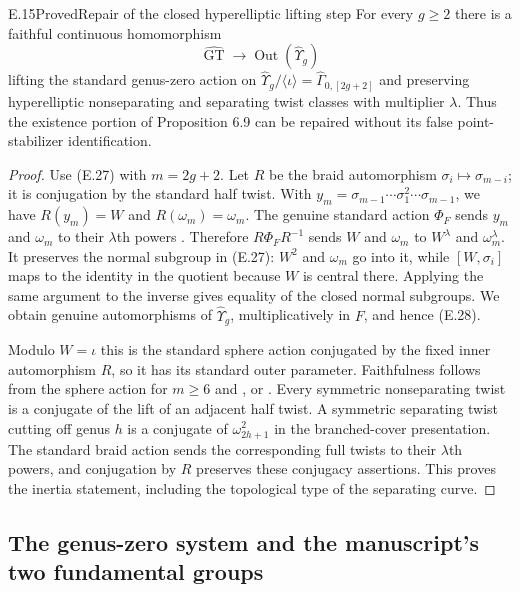\begin{result}{E.15}{Proved}{Repair of the closed hyperelliptic lifting step}
For every $g\geq2$ there is a faithful continuous homomorphism
\[
 \widehat{\operatorname{GT}}\longrightarrow
                         \operatorname{Out}(\widehat\Upsilon_g)
                                                               \tag{E.28}
\]
lifting the standard genus-zero action on
$\widehat\Upsilon_g/\langle\iota\rangle
=\widehat\Gamma_{0,[2g+2]}$ and preserving hyperelliptic
nonseparating and separating twist classes with multiplier
$\lambda$.  Thus the existence portion of Proposition 6.9
can be repaired without its false point-stabilizer identification.
\end{result}
\begin{proof}
Use (E.27) with $m=2g+2$.  Let $R$ be the braid automorphism
$\sigma_i\mapsto\sigma_{m-i}$; it is conjugation by the
standard half twist.  With
$y_m=\sigma_{m-1}\cdots\sigma_1^2\cdots\sigma_{m-1}$,
we have $R(y_m)=W$ and $R(\omega_m)=\omega_m$.
The genuine standard action $\Phi_F$ sends $y_m$ and
$\omega_m$ to their $\lambda$th powers
\cite[Appendix, pp.~34--35]{ET_HS2000}.
Therefore $R\Phi_FR^{-1}$ sends $W$ and $\omega_m$ to
$W^\lambda$ and $\omega_m^\lambda$.
It preserves the normal subgroup in (E.27): $W^2$ and
$\omega_m$ go into it, while $[W,\sigma_i]$ maps to the
identity in the quotient because $W$ is central there.
Applying the same argument to the inverse gives equality
of the closed normal subgroups.  We obtain genuine
automorphisms of $\widehat\Upsilon_g$, multiplicatively in
$F$, and hence (E.28).

Modulo $W=\iota$ this is the standard sphere action conjugated
by the fixed inner automorphism $R$, so it has its standard
outer parameter.  Faithfulness follows from the sphere
action for $m\geq6$ and
\cite[Main Theorem]{ET_HS2000}, or
\cite[Corollary 2.8(i)]{ET_HMM2022}.
Every symmetric nonseparating twist is a conjugate of the
lift of an adjacent half twist.  A symmetric separating
twist cutting off genus $h$ is a conjugate of
$\omega_{2h+1}^2$ in the branched-cover presentation.
The standard braid action sends the corresponding full
twists to their $\lambda$th powers, and conjugation by $R$
preserves these conjugacy assertions.  This proves the
inertia statement, including the topological type of the
separating curve.
\end{proof}

\subsection{The genus-zero system and the manuscript's two fundamental groups}

